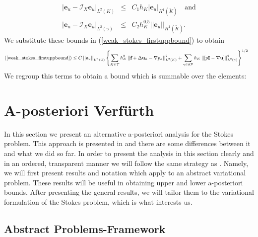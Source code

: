 \documentclass[12pt,a4paper]{article}
\theoremstyle{definition}
\begin{document}
\begin{eqnarray}
	\left|\textbf{e}_u-\mathcal{I}_X\textbf{e}_u\right|_{L^2\left(K\right)} &\leq & C_1h_K\left|\textbf{e}_u\right|_{H^1\left(\widetilde{K}\right)}\quad\text{and}\\
	\left|\textbf{e}_u-\mathcal{I}_X\textbf{e}_u\right|_{L^2\left(\gamma\right)} &\leq &C_2h_K^{0.5}\left|\left|\textbf{e}_u\right|\right|_{H^1\left(\widetilde{K}\right)}.
\end{eqnarray}
We substitute these bounds in (\ref{weak_stokes_firstuppbound}) to obtain
\begin{equation}\small
\begin{aligned}
\text{(\ref{weak_stokes_firstuppbound})}&\leq C\left|\left|\textbf{e}_u\right|\right|_{H^1\left(\Omega\right)}\left\{\sum_{K\in\mathcal{T}}h_K^2\left|\left|\textbf{f}+\Delta \textbf{u}_h-\nabla p_h\right|\right|^2_{L^2\left(K\right)} +\sum_{\gamma\in \partial \mathcal{P}}h_K\left|\left|\left[p\textbf{I}-\nabla\textbf{u}\right]\right|\right|_{L^2\left(\gamma\right)}^2\right\}^{1/2}
\end{aligned}
\end{equation}
We regroup this terms to obtain a bound which is summable over the elements:


\section{A-posteriori Verf{\"u}rth}
In this section we present an alternative a-posteriori analysis for the Stokes problem.  This approach is presented in \cite{verfurth2013posteriori} and there are some differences between it and what we did so far.  In order to present the analysis in this section clearly and in an ordered, transparent manner we will follow the same strategy as \cite{verfurth2013posteriori}. Namely,  we will first present results and notation which apply to an abstract variational problem.  These results will be useful in obtaining upper and lower a-posteriori bounds.  After presenting the general results, we will tailor them to the variational formulation of the Stokes problem, which is what interests us.
\subsection{Abstract Problems-Framework}\label{sec_abst_var_prob}
\end{document}
